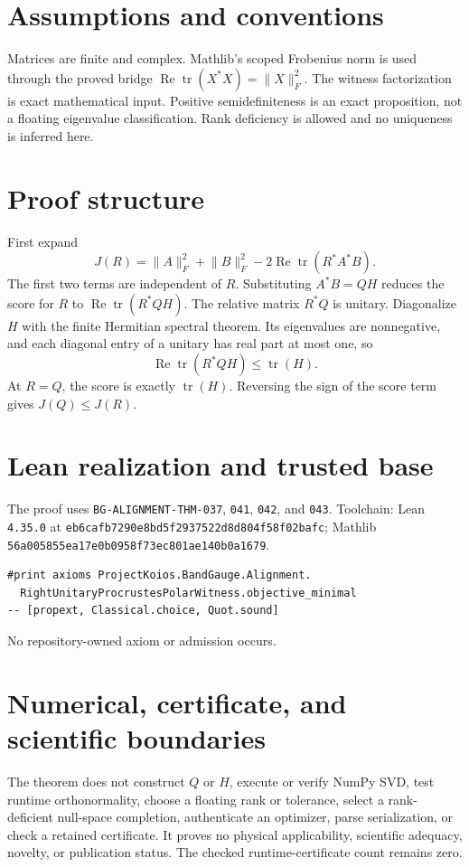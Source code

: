 \documentclass[10pt]{article}
\begin{document}
\section{Assumptions and conventions}
Matrices are finite and complex. Mathlib's scoped Frobenius norm is used through the proved bridge
$\operatorname{Re}\operatorname{tr}(X^*X)=\lVert X\rVert_F^2$. The witness factorization is exact
mathematical input. Positive semidefiniteness is an exact proposition, not a floating eigenvalue
classification. Rank deficiency is allowed and no uniqueness is inferred here.

\section{Proof structure}
First expand
\[
  J(R)=\lVert A\rVert_F^2+\lVert B\rVert_F^2
       -2\operatorname{Re}\operatorname{tr}(R^*A^*B).
\]
The first two terms are independent of $R$. Substituting $A^*B=QH$ reduces the score for $R$ to
$\operatorname{Re}\operatorname{tr}(R^*QH)$. The relative matrix $R^*Q$ is unitary. Diagonalize
$H$ with the finite Hermitian spectral theorem. Its eigenvalues are nonnegative, and each diagonal
entry of a unitary has real part at most one, so
\[
  \operatorname{Re}\operatorname{tr}(R^*QH)\le\operatorname{tr}(H).
\]
At $R=Q$, the score is exactly $\operatorname{tr}(H)$. Reversing the sign of the score term gives
$J(Q)\le J(R)$.

\section{Lean realization and trusted base}
The proof uses \texttt{BG-ALIGNMENT-THM-037}, \texttt{041}, \texttt{042}, and \texttt{043}.
Toolchain: Lean \texttt{4.35.0} at
\texttt{eb6cafb7290e8bd5f2937522d8d804f58f02bafc}; Mathlib
\texttt{56a005855ea17e0b0958f73ec801ae140b0a1679}.
\begin{verbatim}
#print axioms ProjectKoios.BandGauge.Alignment.
  RightUnitaryProcrustesPolarWitness.objective_minimal
-- [propext, Classical.choice, Quot.sound]
\end{verbatim}
No repository-owned axiom or admission occurs.

\section{Numerical, certificate, and scientific boundaries}
The theorem does not construct $Q$ or $H$, execute or verify NumPy SVD, test runtime
orthonormality, choose a floating rank or tolerance, select a rank-deficient null-space completion,
authenticate an optimizer, parse serialization, or check a retained certificate. It proves no
physical applicability, scientific adequacy, novelty, or publication status. The checked
runtime-certificate count remains zero.
\end{document}
